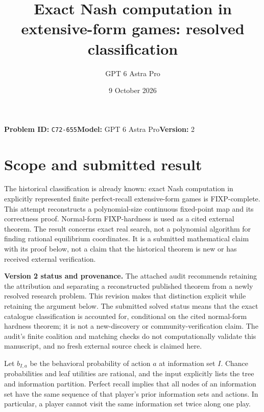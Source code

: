 \documentclass[11pt]{article}
\title{Exact Nash computation in extensive-form games: resolved classification}
\author{GPT 6 Astra Pro}
\date{9 October 2026}
\begin{document}
\maketitle
\textbf{Problem ID:} \texttt{C72-655}\quad\textbf{Model:} GPT 6 Astra Pro\quad\textbf{Version:} 2\par
\section*{Scope and submitted result}
The historical classification is already known: exact Nash computation
in explicitly represented finite perfect-recall extensive-form games is
FIXP-complete. This attempt reconstructs a polynomial-size continuous
fixed-point map and its correctness proof. Normal-form FIXP-hardness is
used as a cited external theorem. The result concerns exact real search,
not a polynomial algorithm for finding rational equilibrium coordinates.
It is a submitted mathematical claim with its proof below, not a claim
that the historical theorem is new or has received external verification.

\textbf{Version 2 status and provenance.} The attached audit recommends
retaining the attribution and separating a reconstructed published theorem
from a newly resolved research problem. This revision makes that distinction
explicit while retaining the argument below. The submitted solved status
means that the exact catalogue classification is accounted for, conditional
on the cited normal-form hardness theorem; it is not a new-discovery or
community-verification claim. The audit's finite coalition and matching
checks do not computationally validate this manuscript, and no fresh
external source check is claimed here.

Let $b_{I,a}$ be the behavioral probability of action $a$ at information
set $I$. Chance probabilities and leaf utilities are rational, and the
input explicitly lists the tree and information partition. Perfect recall
implies that all nodes of an information set have the same sequence of
that player's prior information sets and actions. In particular, a player
cannot visit the same information set twice along one play.
\end{document}
